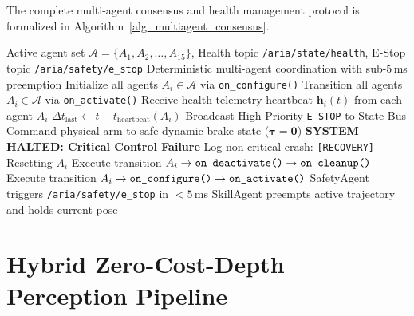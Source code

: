 \documentclass[journal]{IEEEtran}
\begin{document}
The complete multi-agent consensus and health management protocol is formalized in Algorithm~\ref{alg_multiagent_consensus}.

\begin{algorithm}[!t]
\caption{ARIA Multi-Agent Consensus and Health Management Protocol}
\label{alg_multiagent_consensus}
\begin{algorithmic}[1]
\REQUIRE Active agent set $\mathcal{A} = \{A_1, A_2, \dots, A_{15}\}$, Health topic \texttt{/aria/state/health}, E-Stop topic \texttt{/aria/safety/e\_stop}
\ENSURE Deterministic multi-agent coordination with sub-5\,ms preemption
\STATE Initialize all agents $A_i \in \mathcal{A}$ via \texttt{on\_configure()}
\STATE Transition all agents $A_i \in \mathcal{A}$ via \texttt{on\_activate()}
    \STATE Receive health telemetry heartbeat $\mathbf{h}_i(t)$ from each agent $A_i$
        \STATE $\Delta t_{\text{last}} \leftarrow t - t_{\text{heartbeat}}(A_i)$
                \STATE Broadcast High-Priority \texttt{E-STOP} to State Bus
                \STATE Command physical arm to safe dynamic brake state ($\boldsymbol{\tau} = \mathbf{0}$)
                \RETURN \textbf{SYSTEM HALTED: Critical Control Failure}
            \ELSE
                \STATE Log non-critical crash: \texttt{[RECOVERY]} Resetting $A_i$
                \STATE Execute transition $A_i \to \text{\texttt{on\_deactivate()}} \to \text{\texttt{on\_cleanup()}}$
                \STATE Execute transition $A_i \to \text{\texttt{on\_configure()}} \to \text{\texttt{on\_activate()}}$
            \ENDIF
        \ENDIF
    \ENDFOR
        \STATE SafetyAgent triggers \texttt{/aria/safety/e\_stop} in $<5$\,ms
        \STATE SkillAgent preempts active trajectory and holds current pose
    \ENDIF
\ENDWHILE
\end{algorithmic}
\end{algorithm}

\section{Hybrid Zero-Cost-Depth Perception Pipeline}
\end{document}
